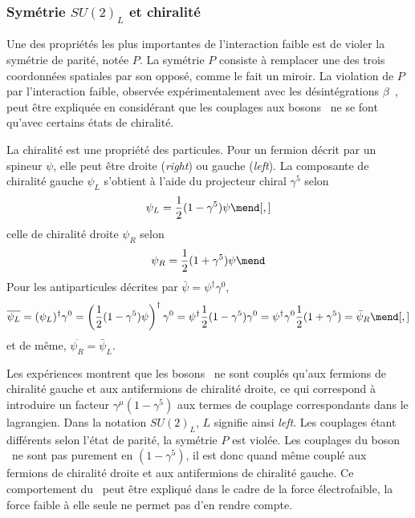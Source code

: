 \subsubsection{Symétrie $SU(2)_L$ et chiralité}\label{chapter-MS-MSSM-section-formalisme-subsec-EW-SU2_L}
Une des propriétés les plus importantes de l'interaction faible est de violer la symétrie de parité, notée $P$.
La symétrie $P$ consiste à remplacer une des trois coordonnées spatiales par son opposé, comme le fait un miroir.
La violation de $P$ par l'interaction faible, observée expérimentalement avec les désintégrations $\beta$~\cite{Wu_P_violation}, peut être expliquée en considérant que les couplages aux bosons \Wboson\ ne se font qu'avec certains états de chiralité.
\par
La chiralité est une propriété des particules.
Pour un fermion décrit par un spineur $\psi$,
elle peut être droite (\emph{right}) ou gauche (\emph{left}).
La composante de chiralité gauche $\psi_L$ s'obtient à l'aide du projecteur chiral $\gamma^5$ selon
\begin{equation}
\psi_L = \frac{1}{2}(1-\gamma^5)\psi
\mend[,]
\label{eq-projo_L}
\end{equation}
celle de chiralité droite $\psi_R$ selon
\begin{equation}
\psi_R = \frac{1}{2}(1+\gamma^5)\psi
\mend
\label{eq-projo_R}
\end{equation}
Pour les antiparticules décrites par $\bar{\psi}=\psi^\dagger \gamma^0$,
\begin{equation}
\overline{\psi_L}
= (\psi_L)^\dagger \gamma^0
= \left(\frac{1}{2}(1-\gamma^5)\psi\right)^\dagger\gamma^0
= \psi^\dagger \frac{1}{2} (1-\gamma^5) \gamma^0
= \psi^\dagger \gamma^0 \frac{1}{2} (1+\gamma^5)
= \bar{\psi}_R
\mend[,]
\end{equation}
et de même, $\overline{\psi_R} = \bar{\psi}_L$.
\par
Les expériences montrent que les bosons \Wboson\ ne sont couplés qu'aux fermions de chiralité gauche et aux antifermions de chiralité droite, ce qui correspond à introduire un facteur $\gamma^\mu(1-\gamma^5)$ aux termes de couplage correspondants dans le lagrangien.
Dans la notation $SU(2)_L$, $L$ signifie ainsi \emph{left}.
Les couplages étant différents selon l'état de parité, la symétrie $P$ est violée.
Les couplages du boson \Zboson\ ne sont pas purement en $(1-\gamma^5)$, il est donc quand même couplé aux fermions de chiralité droite et aux antifermions de chiralité gauche.
Ce comportement du \Zboson\ peut être expliqué dans le cadre de la force électrofaible, la force faible à elle seule ne permet pas d'en rendre compte.
